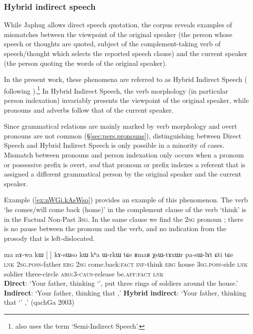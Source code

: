 \subsubsection{Hybrid indirect speech} \label{sec:hybrid indirect}
While Japhug allows direct speech quotation, the corpus reveals examples of mismatches between the viewpoint of the original speaker (the person whose speech or thoughts are quoted, subject of the com\-ple\-ment-taking verb of speech/thought which selects the reported speech clause) and the current speaker (the person quoting the words of the original speaker).

In the present work, these phenomena are referred to as Hybrid Indirect Speech (\citealt{jacques16complementation} following \citet{tournadre08conjunct}).\footnote{\citet{aikhenvald08semidirect} also uses the term `Semi-Indirect Speech'. } In Hybrid Indirect Speech, the verb morphology (in particular person indexation) invariably presents the viewpoint of the original speaker, while pronouns and adverbs follow that of the current speaker.

Since grammatical relations are mainly marked by verb morphology and overt pronouns are not common (§\ref{sec:pers.pronouns}), distinguishing between Direct Speech and Hybrid Indirect Speech is only possible in a minority of cases. Mismatch between pronouns and person indexation only occurs when a pronoun or possessive prefix is overt, \textit{and} that pronoun or prefix indexes a referent that is assigned a different grammatical person by the  original speaker and the current speaker.
 
   
Example (\ref{ex:nWGi.kAsWso}) provides an example of this phenomenon. The verb  `he comes/will come back (home)' in the complement clause of the verb  `think' is in the Factual Non-Past \textsc{3sg}. In the same clause we find the \textsc{2sg} pronoun ; there is no pause between the pronoun and the verb, and no indication from the prosody that  is left-dislocated. 


\begin{exe}
\ex \label{ex:nWGi.kAsWso}
\gll ma nɤ-wa kɯ [ 	]  kɤ-sɯso kɯ kʰa ɯ-rkɯ tɕe ʁmaʁ χsɯ-tɤxɯr pa-sɯ-lɤt ɕti tɕe \\
\textsc{lnk} \textsc{2sg}.\textsc{poss}-father \textsc{erg} \textsc{2sg} {come.back:\textsc{fact}}  \textsc{inf}-think \textsc{erg} house \textsc{3sg}.\textsc{poss}-side \textsc{lnk} soldier three-circle \textsc{aro}:3\flobv{}-\textsc{caus}-release be.\textsc{aff}:\textsc{fact} \textsc{lnk}\\
\glt \textbf{Direct}: `Your father, thinking `', put three rings of soldiers around the house.' 
\glt  \textbf{Indirect}: `Your father, thinking that ,'
\glt  \textbf{Hybrid indirect}: `Your father, thinking that `' ,' (qachGa 2003)
\end{exe}

